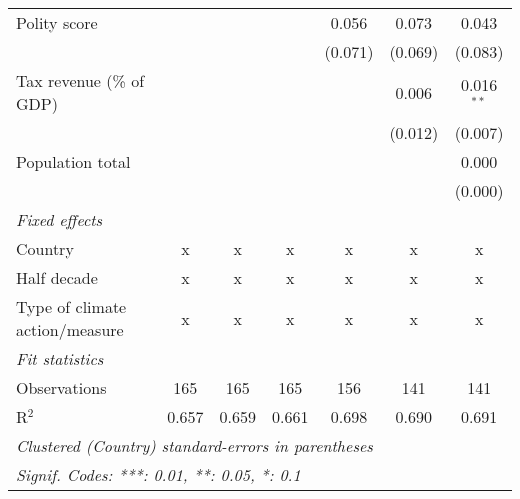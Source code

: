 \begin{tabular}{lcccccc}
   Polity score                                                              &         &         &         & 0.056         & 0.073         & 0.043\\   
                                                                             &         &         &         & (0.071)       & (0.069)       & (0.083)\\   
   Tax revenue (\% of GDP)                                                   &         &         &         &               & 0.006         & 0.016$^{**}$\\   
                                                                             &         &         &         &               & (0.012)       & (0.007)\\   
   Population total                                                          &         &         &         &               &               & 0.000\\   
                                                                             &         &         &         &               &               & (0.000)\\   
   \emph{Fixed effects}\\
   Country                                                                   & x       & x       & x       & x             & x             & x\\  
   Half decade                                                               & x       & x       & x       & x             & x             & x\\  
   Type of climate action/measure                                            & x       & x       & x       & x             & x             & x\\  
   \midrule \emph{Fit statistics}\\
   Observations                                                              & 165     & 165     & 165     & 156           & 141           & 141\\  
   R$^2$                                                                     & 0.657   & 0.659   & 0.661   & 0.698         & 0.690         & 0.691\\  
   \midrule
   \multicolumn{7}{l}{\emph{Clustered (Country) standard-errors in parentheses}}\\
   \multicolumn{7}{l}{\emph{Signif. Codes: ***: 0.01, **: 0.05, *: 0.1}}\\
\end{tabular}
\par\endgroup


